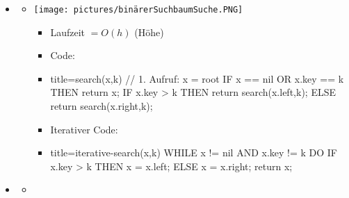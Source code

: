\documentclass[
    12pt,
    a4paper,
    ngerman,
    color=3b,%
    marginpar=false,
    colorback=false,
    leqno,
]{tudaexercise}
\begin{document}
\begin{itemize}
    \item {}
          \begin{itemize}
              \item[]
                    \begin{minipage}{0.4\textwidth}
                        \texttt{[image: pictures/binärerSuchbaumSuche.PNG]}
                    \end{minipage}
                    \begin{minipage}{0.5\textwidth}
                        \begin{itemize}
                            \item Laufzeit $= O(h)$ (Höhe)
                            \item Code:
                            \item[]
                                  \begin{codeBlock}[autogobble]{title={search(x,k) // 1. Aufruf: x = root}}
                                      IF x == nil OR x.key == k THEN
                                        return x;
                                      IF x.key > k THEN
                                        return search(x.left,k);
                                      ELSE
                                        return search(x.right,k);
                                  \end{codeBlock}
                            \item Iterativer Code:
                            \item[]
                                  \begin{codeBlock}[autogobble]{title={iterative-search(x,k)}}
                                      WHILE x != nil AND x.key != k DO
                                        IF x.key > k THEN
                                            x = x.left;
                                        ELSE
                                            x = x.right;
                                      return x;
                                  \end{codeBlock}
                        \end{itemize}
                    \end{minipage}
          \end{itemize}
          \clearpage
    \item {}
          \begin{itemize}
              \item[]

\end{itemize}
\end{itemize}
\end{document}
